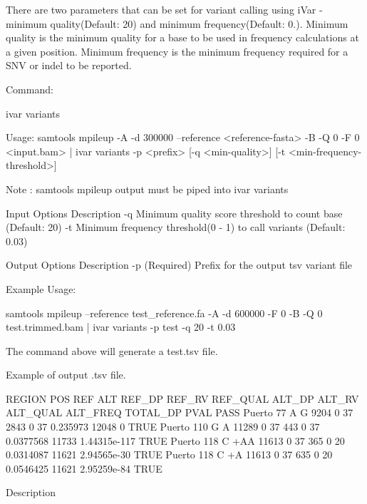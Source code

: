 There are two parameters that can be set for variant calling using i\+Var -\/ minimum quality(\+Default\+: 20) and minimum frequency(Default\+: 0.). Minimum quality is the minimum quality for a base to be used in frequency calculations at a given position. Minimum frequency is the minimum frequency required for a S\+NV or indel to be reported.

Command\+: 
\begin{DoxyCode}
ivar variants

Usage: samtools mpileup -A -d 300000 --reference <reference-fasta> -B -Q 0 -F 0 <input.bam> | ivar variants
       -p <prefix> [-q <min-quality>] [-t <min-frequency-threshold>]

Note : samtools mpileup output must be piped into ivar variants

Input Options    Description
           -q    Minimum quality score threshold to count base (Default: 20)
           -t    Minimum frequency threshold(0 - 1) to call variants (Default: 0.03)

Output Options   Description
           -p    (Required) Prefix for the output tsv variant file
\end{DoxyCode}


Example Usage\+: 
\begin{DoxyCode}
samtools mpileup --reference test\_reference.fa -A -d 600000 -F 0 -B -Q 0 test.trimmed.bam | ivar variants
       -p test -q 20 -t 0.03
\end{DoxyCode}


The command above will generate a test.\+tsv file.

Example of output .tsv file.


\begin{DoxyCode}
REGION  POS REF ALT REF\_DP  REF\_RV  REF\_QUAL    ALT\_DP  ALT\_RV  ALT\_QUAL    ALT\_FREQ    TOTAL\_DP    PVAL   
       PASS
Puerto  77  A   G   9204    0   37  2843    0   37  0.235973    12048   0   TRUE
Puerto  110 G   A   11289   0   37  443 0   37  0.0377568   11733   1.44315e-117    TRUE
Puerto  118 C   +AA 11613   0   37  365 0   20  0.0314087   11621   2.94565e-30 TRUE
Puerto  118 C   +A  11613   0   37  635 0   20  0.0546425   11621   2.95259e-84 TRUE
\end{DoxyCode}


Description

